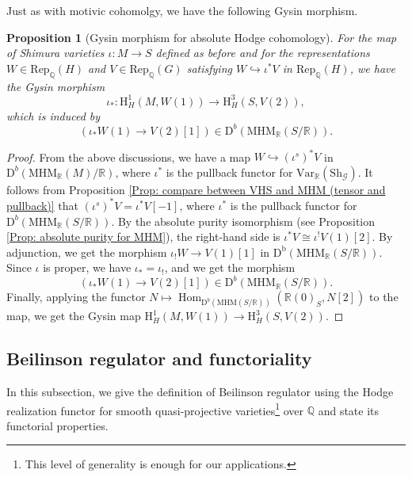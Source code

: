 \documentclass[11pt, a4paper]{amsart}
\theoremstyle{plain}
\newtheorem{proposition}[theorem]{Proposition}
\theoremstyle{definition}
\numberwithin{equation}{section}
\def\QQ{\mathbb{Q}}
\def\RR{\mathbb{R}}
\DeclareMathOperator{\Hom}{Hom}
\newcommand{\Sh}{\mathrm{Sh}}
\begin{document}
Just as with motivic cohomolgy, we have the following Gysin morphism. 

\begin{proposition}[Gysin morphism for absolute Hodge cohomology]
\label{Prop: Gysin for abs Hdg cohomology}
    For the map of Shimura varieties $\iota \colon M \rightarrow S$ defined as before and for the representations $W \in \mathrm{Rep}_{\QQ}(H)$ and $V \in \mathrm{Rep}_{\QQ}(G)$ satisfying $W \hookrightarrow \iota^{*}V$ in $\mathrm{Rep}_{\QQ}(H)$, we have the Gysin morphism 
    \[
    \iota_{*} \colon \mathrm{H}^{1}_{H}(M, W(1)) \rightarrow \mathrm{H}^{3}_{H}(S, V(2)), 
    \]
    which is induced by 
    \begin{equation}
    \label{eq: Gysin morphism in derived category of MHM}
        (\iota_{*}W(1) \rightarrow V(2)[1]) \in \mathrm{D}^{b}(\mathrm{MHM}_{\RR}(S/\RR)). 
    \end{equation}
\end{proposition}
\begin{proof}
From the above discussions, we have a map $W \hookrightarrow (\iota^{s})^{*}V$ in $\mathrm{D}^{b}(\mathrm{MHM}_{\RR}(M)/\RR)$, where $\iota^{*}$ is the pullback functor for $\mathrm{Var}_{\RR}(\Sh_{\mathcal{G}})$. It follows from Proposition \ref{Prop: compare between VHS and MHM (tensor and pullback)} that $(\iota^{s})^{*}V = \iota^{*}V[-1]$,  where $\iota^{*}$ is the pullback functor for $\mathrm{D}^{b}(\mathrm{MHM}_{\RR}(S/\RR))$. By the absolute purity isomorphism (see Proposition \ref{Prop: absolute purity for MHM}), the right-hand side is $\iota^{*}V \cong \iota^{!}V(1)[2]$. By adjunction, we get the morphism $\iota_{!}W \rightarrow V(1)[1]$ in $\mathrm{D}^{\mathrm{b}}(\mathrm{MHM}_{\RR}(S/\RR))$. Since $\iota$ is proper, we have $\iota_{*} = \iota_{!}$, and we get the morphism 
\begin{equation*}
    (\iota_{*}W(1) \rightarrow V(2)[1]) \in \mathrm{D}^{b}(\mathrm{MHM}_{\RR}(S/\RR)). 
\end{equation*}
Finally, applying the functor $N \mapsto \Hom_{\mathrm{D}^{b}(\mathrm{MHM}(S/\RR))}(\RR(0)_{S}, N[2])$ to the map, we get the Gysin map $\mathrm{H}^{1}_{H}(M, W(1)) \rightarrow \mathrm{H}^{3}_{H}(S, V(2))$. 
\end{proof}

 \subsection{Beilinson regulator and functoriality}
 \label{SS: Beilinson regulator}
 In this subsection, we give the definition of Beilinson regulator using the Hodge realization functor for smooth quasi-projective varieties\footnote{This level of generality is enough for our applications.} over $\QQ$ and state its functorial properties.
\end{document}
